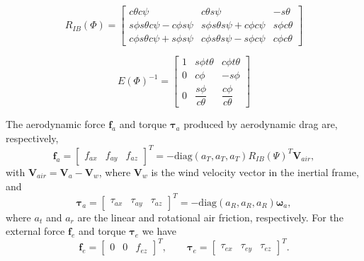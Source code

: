 \begin{equation}
R_{IB}(\Phi) =
\begin{bmatrix}
c\theta c\psi &
c\theta s\psi &
- s\theta \\
s\phi s\theta c\psi - c\phi s\psi &
s\phi s\theta s\psi + c\phi c\psi &
s\phi c\theta \\
c\phi s\theta c\psi + s\phi s\psi &
c\phi s\theta s\psi - s\phi c\psi &
c\phi c\theta
\end{bmatrix}
\label{eq.3:rotation_matrix}
\end{equation}

\begin{equation}
E(\Phi)^{-1} =
\begin{bmatrix}
1 & s\phi t\theta & c\phi t\theta \\
0 & c\phi & -s\phi \\
0 & \dfrac{s\phi}{c\theta} & \dfrac{c\phi}{c\theta}
\end{bmatrix}
\label{eq.3:jacobian_matrix}
\end{equation}

The aerodynamic force $\mathbf{f}_a$ and torque $\boldsymbol{\tau}_a$ produced by aerodynamic drag
are, respectively,
\begin{equation}
\mathbf{f}_a =
\begin{bmatrix}
f_{ax} & f_{ay} & f_{az}
\end{bmatrix}^{T}
=
- \mathrm{diag}(a_T, a_T, a_T) R_{IB}(\Psi)^{T} \mathbf{V}_{air},
\end{equation}
with $\mathbf{V}_{air} = \mathbf{V}_a - \mathbf{V}_w$, where $\mathbf{V}_w$ is the wind velocity vector
in the inertial frame, and
\begin{equation}
\boldsymbol{\tau}_a =
\begin{bmatrix}
\tau_{ax} & \tau_{ay} & \tau_{az}
\end{bmatrix}^{T}
=
- \mathrm{diag}(a_R, a_R, a_R)\boldsymbol{\omega}_a,
\end{equation}
where $a_t$ and $a_r$ are the linear and rotational air friction, respectively.
For the external force $\mathbf{f}_e$ and torque $\boldsymbol{\tau}_e$ we have
\begin{equation}
\mathbf{f}_e =
\begin{bmatrix}
0 & 0 & f_{ez}
\end{bmatrix}^{T},
\qquad
\boldsymbol{\tau}_e =
\begin{bmatrix}
\tau_{ex} & \tau_{ey} & \tau_{ez}
\end{bmatrix}^{T}.
\end{equation}

